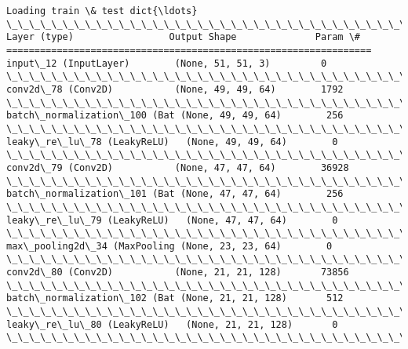 \documentclass[11pt]{article}
\begin{document}
    \begin{Verbatim}[commandchars=\\\{\}]
Loading train \& test dict{\ldots}
\_\_\_\_\_\_\_\_\_\_\_\_\_\_\_\_\_\_\_\_\_\_\_\_\_\_\_\_\_\_\_\_\_\_\_\_\_\_\_\_\_\_\_\_\_\_\_\_\_\_\_\_\_\_\_\_\_\_\_\_\_\_\_\_\_
Layer (type)                 Output Shape              Param \#   
=================================================================
input\_12 (InputLayer)        (None, 51, 51, 3)         0         
\_\_\_\_\_\_\_\_\_\_\_\_\_\_\_\_\_\_\_\_\_\_\_\_\_\_\_\_\_\_\_\_\_\_\_\_\_\_\_\_\_\_\_\_\_\_\_\_\_\_\_\_\_\_\_\_\_\_\_\_\_\_\_\_\_
conv2d\_78 (Conv2D)           (None, 49, 49, 64)        1792      
\_\_\_\_\_\_\_\_\_\_\_\_\_\_\_\_\_\_\_\_\_\_\_\_\_\_\_\_\_\_\_\_\_\_\_\_\_\_\_\_\_\_\_\_\_\_\_\_\_\_\_\_\_\_\_\_\_\_\_\_\_\_\_\_\_
batch\_normalization\_100 (Bat (None, 49, 49, 64)        256       
\_\_\_\_\_\_\_\_\_\_\_\_\_\_\_\_\_\_\_\_\_\_\_\_\_\_\_\_\_\_\_\_\_\_\_\_\_\_\_\_\_\_\_\_\_\_\_\_\_\_\_\_\_\_\_\_\_\_\_\_\_\_\_\_\_
leaky\_re\_lu\_78 (LeakyReLU)   (None, 49, 49, 64)        0         
\_\_\_\_\_\_\_\_\_\_\_\_\_\_\_\_\_\_\_\_\_\_\_\_\_\_\_\_\_\_\_\_\_\_\_\_\_\_\_\_\_\_\_\_\_\_\_\_\_\_\_\_\_\_\_\_\_\_\_\_\_\_\_\_\_
conv2d\_79 (Conv2D)           (None, 47, 47, 64)        36928     
\_\_\_\_\_\_\_\_\_\_\_\_\_\_\_\_\_\_\_\_\_\_\_\_\_\_\_\_\_\_\_\_\_\_\_\_\_\_\_\_\_\_\_\_\_\_\_\_\_\_\_\_\_\_\_\_\_\_\_\_\_\_\_\_\_
batch\_normalization\_101 (Bat (None, 47, 47, 64)        256       
\_\_\_\_\_\_\_\_\_\_\_\_\_\_\_\_\_\_\_\_\_\_\_\_\_\_\_\_\_\_\_\_\_\_\_\_\_\_\_\_\_\_\_\_\_\_\_\_\_\_\_\_\_\_\_\_\_\_\_\_\_\_\_\_\_
leaky\_re\_lu\_79 (LeakyReLU)   (None, 47, 47, 64)        0         
\_\_\_\_\_\_\_\_\_\_\_\_\_\_\_\_\_\_\_\_\_\_\_\_\_\_\_\_\_\_\_\_\_\_\_\_\_\_\_\_\_\_\_\_\_\_\_\_\_\_\_\_\_\_\_\_\_\_\_\_\_\_\_\_\_
max\_pooling2d\_34 (MaxPooling (None, 23, 23, 64)        0         
\_\_\_\_\_\_\_\_\_\_\_\_\_\_\_\_\_\_\_\_\_\_\_\_\_\_\_\_\_\_\_\_\_\_\_\_\_\_\_\_\_\_\_\_\_\_\_\_\_\_\_\_\_\_\_\_\_\_\_\_\_\_\_\_\_
conv2d\_80 (Conv2D)           (None, 21, 21, 128)       73856     
\_\_\_\_\_\_\_\_\_\_\_\_\_\_\_\_\_\_\_\_\_\_\_\_\_\_\_\_\_\_\_\_\_\_\_\_\_\_\_\_\_\_\_\_\_\_\_\_\_\_\_\_\_\_\_\_\_\_\_\_\_\_\_\_\_
batch\_normalization\_102 (Bat (None, 21, 21, 128)       512       
\_\_\_\_\_\_\_\_\_\_\_\_\_\_\_\_\_\_\_\_\_\_\_\_\_\_\_\_\_\_\_\_\_\_\_\_\_\_\_\_\_\_\_\_\_\_\_\_\_\_\_\_\_\_\_\_\_\_\_\_\_\_\_\_\_
leaky\_re\_lu\_80 (LeakyReLU)   (None, 21, 21, 128)       0         
\_\_\_\_\_\_\_\_\_\_\_\_\_\_\_\_\_\_\_\_\_\_\_\_\_\_\_\_\_\_\_\_\_\_\_\_\_\_\_\_\_\_\_\_\_\_\_\_\_\_\_\_\_\_\_\_\_\_\_\_\_\_\_\_\_

\end{Verbatim}
\end{document}
